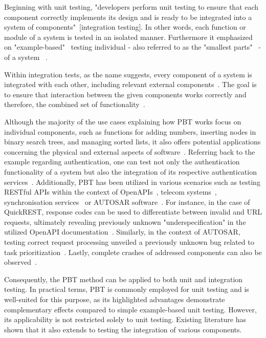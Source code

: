 \documentclass[runningheads]{llncs}
\begin{document}
Beginning with unit testing, "developers perform unit testing to ensure that each component correctly implements its design and is ready to be integrated into a system of components"~[integration testing]. In other words, each function or module of a system is tested in an isolated manner. Furthermore it emphasized on "example-based"~\cite{Corgozinho2023} testing individual - also referred to as the "smallest parts"~\cite{Aniche2022} - of a system ~\cite{Hartmann2000,Corgozinho2023}.

Within integration tests, as the name suggests, every component of a system is integrated with each other, including relevant external components~\cite{Aniche2022,Hartmann2000,Radziwill2020}. The goal is to ensure that interaction between the given components works correctly and therefore, the combined set of functionality~\cite{Hartmann2000,Aniche2022}.

Although the majority of the use cases explaining how PBT works focus on individual components, such as functions for adding numbers, inserting nodes in binary search trees, 
and managing sorted lists, it also offers potential applications concerning the physical and external aspects of software~\cite{Chen2022}. Referring back to the example regarding authentication, one can test not only the authentication functionality of a system but also the integration of its respective authentication services~\cite{Fink1997}. Additionally, PBT has been utilized in various scenarios such as testing RESTful APIs within the context of OpenAPIs~\cite{Karlsson2019}, telecom systems~\cite{Arts2006}, synchronisation services~\cite{Hughes2016} or AUTOSAR software~\cite{Arts2015}. For instance, in the case of QuickREST, response codes can be used to differentiate between invalid and URL requests, ultimately revealing previously unknown "underspecification" in the utilized OpenAPI documentation~\cite{Karlsson2019}. Similarly, in the context of AUTOSAR, testing correct request processing unveiled a previously unknown bug related to task prioritization~\cite{Arts2015}. Lastly, complete crashes of addressed components can also be observed~\cite{Arts2006}.

Consequently, the PBT method can be applied to both unit and integration testing. In practical terms, PBT is commonly employed for unit testing and is well-suited for this purpose, as its highlighted advantages demonstrate complementary effects compared to simple example-based unit testing. However, its applicability is not restricted solely to unit testing. Existing literature has shown that it also extends to testing the integration of various components.
\end{document}

